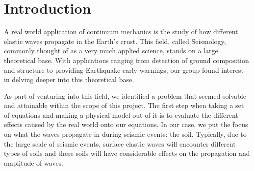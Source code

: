\chapter{Introduction}

A real world application of continuum mechanics is the study of how different elastic waves propagate in the Earth's crust. This field, called Seismology, commonly thought of as a very much applied science, stands on a large theoretical base. With applications ranging from detection of ground composition and structure\cite{https://doi.org/10.1029/95JB00259} to providing Earthquake early warnings\cite{government_of_canada_2019}, our group found interest in delving deeper into this theoretical base.

As part of venturing into this field, we identified a problem that seemed solvable and attainable within the scope of this project. The first step when taking a set of equations and making a physical model out of it is to evaluate the different effects caused by the real world onto our equations. In our case, we put the focus on what the waves propagate in during seismic events: the soil. Typically, due to the large scale of seismic events, surface elastic waves will encounter different types of soils and these soils will have considerable effects on the propagation and amplitude of waves.

